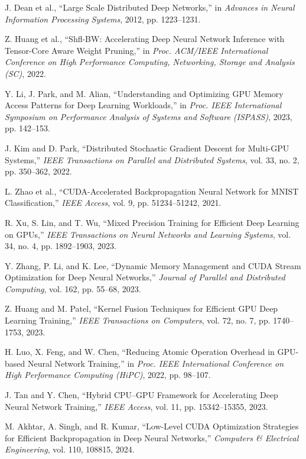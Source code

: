 \documentclass[conference]{IEEEtran}
\begin{document}
\begin{thebibliography}{00}
 J. Dean et al., ``Large Scale Distributed Deep Networks,'' in \textit{Advances in Neural Information Processing Systems}, 2012, pp. 1223–1231.

 Z. Huang et al., ``Shfl-BW: Accelerating Deep Neural Network Inference with Tensor-Core Aware Weight Pruning,'' in \textit{Proc. ACM/IEEE International Conference on High Performance Computing, Networking, Storage and Analysis (SC)}, 2022.

 Y. Li, J. Park, and M. Alian, ``Understanding and Optimizing GPU Memory Access Patterns for Deep Learning Workloads,'' in \textit{Proc. IEEE International Symposium on Performance Analysis of Systems and Software (ISPASS)}, 2023, pp. 142–153.

 J. Kim and D. Park, ``Distributed Stochastic Gradient Descent for Multi-GPU Systems,'' \textit{IEEE Transactions on Parallel and Distributed Systems}, vol. 33, no. 2, pp. 350–362, 2022.

 L. Zhao et al., ``CUDA-Accelerated Backpropagation Neural Network for MNIST Classification,'' \textit{IEEE Access}, vol. 9, pp. 51234–51242, 2021.

 R. Xu, S. Lin, and T. Wu, ``Mixed Precision Training for Efficient Deep Learning on GPUs,'' \textit{IEEE Transactions on Neural Networks and Learning Systems}, vol. 34, no. 4, pp. 1892–1903, 2023.

 Y. Zhang, P. Li, and K. Lee, ``Dynamic Memory Management and CUDA Stream Optimization for Deep Neural Networks,'' \textit{Journal of Parallel and Distributed Computing}, vol. 162, pp. 55–68, 2023.

 Z. Huang and M. Patel, ``Kernel Fusion Techniques for Efficient GPU Deep Learning Training,'' \textit{IEEE Transactions on Computers}, vol. 72, no. 7, pp. 1740–1753, 2023.

 H. Luo, X. Feng, and W. Chen, ``Reducing Atomic Operation Overhead in GPU-based Neural Network Training,'' in \textit{Proc. IEEE International Conference on High Performance Computing (HiPC)}, 2022, pp. 98–107.

 J. Tan and Y. Chen, ``Hybrid CPU–GPU Framework for Accelerating Deep Neural Network Training,'' \textit{IEEE Access}, vol. 11, pp. 15342–15355, 2023.

 M. Akhtar, A. Singh, and R. Kumar, ``Low-Level CUDA Optimization Strategies for Efficient Backpropagation in Deep Neural Networks,'' \textit{Computers \& Electrical Engineering}, vol. 110, 108815, 2024.

\end{thebibliography}
\end{document}
